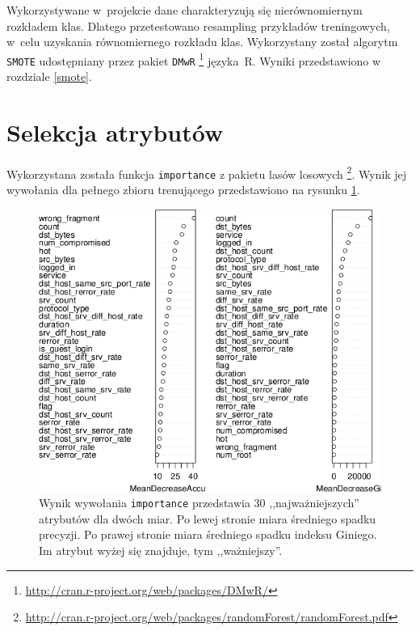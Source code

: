 \documentclass[a4paper, 12pt]{article}
\begin{document}
Wykorzystywane w~projekcie dane charakteryzują się nierównomiernym rozkładem klas. 
Dlatego przetestowano resampling przykładów treningowych, w~celu uzyskania równomiernego rozkładu klas. 
Wykorzystany został algorytm \texttt{SMOTE} udostępniany przez pakiet 
\texttt{DMwR} \footnote{\url{http://cran.r-project.org/web/packages/DMwR/}} języka~R.
Wyniki przedstawiono w rozdziale \ref{smote}.

\section{Selekcja atrybutów}
\label{sec:selekcja}

Wykorzystana została funkcja \texttt{importance} z pakietu lasów losowych
\footnote{\url{http://cran.r-project.org/web/packages/randomForest/randomForest.pdf}}.
Wynik jej wywołania dla pełnego zbioru trenującego przedstawiono na rysunku \ref{fig:attr}.

\begin{figure}[H]
\centering
\includegraphics[width=.9\textwidth]{attr}
\caption{Wynik wywołania \texttt{importance} przedstawia 30 ,,najważniejszych'' atrybutów
dla dwóch miar. 
Po lewej stronie miara średniego spadku precyzji.
Po prawej stronie miara średniego spadku indeksu Giniego. 
Im atrybut wyżej się znajduje, tym ,,ważniejszy''.}
\label{fig:attr}
\end{figure}
\end{document}
